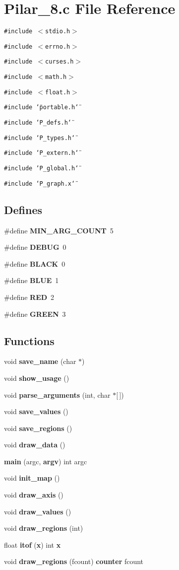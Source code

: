 \section{Pilar\_\-8.c File Reference}
\label{Pilar__8_8c}
{\tt \#include $<$stdio.h$>$}\par
{\tt \#include $<$errno.h$>$}\par
{\tt \#include $<$curses.h$>$}\par
{\tt \#include $<$math.h$>$}\par
{\tt \#include $<$float.h$>$}\par
{\tt \#include \char`\"{}portable.h\char`\"{}}\par
{\tt \#include \char`\"{}P\_\-defs.h\char`\"{}}\par
{\tt \#include \char`\"{}P\_\-types.h\char`\"{}}\par
{\tt \#include \char`\"{}P\_\-extern.h\char`\"{}}\par
{\tt \#include \char`\"{}P\_\-global.h\char`\"{}}\par
{\tt \#include \char`\"{}P\_\-graph.x\char`\"{}}\par
\subsection*{Defines}
\begin{CompactItemize}
\item 
\#define {\bf MIN\_\-ARG\_\-COUNT}\ 5
\item 
\#define {\bf DEBUG}\ 0
\item 
\#define {\bf BLACK}\ 0
\item 
\#define {\bf BLUE}\ 1
\item 
\#define {\bf RED}\ 2
\item 
\#define {\bf GREEN}\ 3
\end{CompactItemize}
\subsection*{Functions}
\begin{CompactItemize}
\item 
void {\bf save\_\-name} (char $\ast$)
\item 
void {\bf show\_\-usage} ()
\item 
void {\bf parse\_\-arguments} (int, char $\ast$[$\,$])
\item 
void {\bf save\_\-values} ()
\item 
void {\bf save\_\-regions} ()
\item 
void {\bf draw\_\-data} ()
\item 
{\bf main} (argc, {\bf argv}) int argc
\item 
void {\bf init\_\-map} ()
\item 
void {\bf draw\_\-axis} ()
\item 
void {\bf draw\_\-values} ()
\item 
void {\bf draw\_\-regions} (int)
\item 
float {\bf itof} ({\bf x}) int {\bf x}
\item 
void {\bf draw\_\-regions} (fcount) {\bf counter} fcount
\end{CompactItemize}
